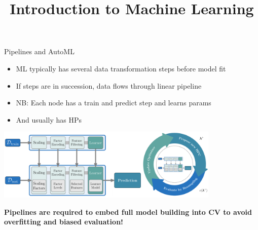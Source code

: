 
\newcommand{\titlefigure}{figure_man/linear_pipeline.png}
\newcommand{\learninggoals}{
\item Be able to explain a linear pipeline
\item Understand how HPO pipelines can be represented as DAGs
\item Know the difference between the HP space of a linear pipeline and a 
DAG}
\usepackage{../../style/lmu-lecture}




\title{Introduction to Machine Learning}
\date{}




\sloppy

\begin{vbframe}{Pipelines and AutoML}
\begin{itemize}
    \item ML typically has several data transformation steps before model fit
    \item If steps are in succession, data flows through linear pipeline
    \item NB: Each node has a train and predict step and learns params
    \item And usually has HPs
\end{itemize}


\vspace{0.5em}

\begin{center}
\includegraphics[width = 0.8\textwidth]{figure_man/linear_pipeline.png}
\end{center}

\vspace{0.5em}

\pause
\textbf{Pipelines are required to embed full model building into CV to avoid overfitting and biased evaluation!}
\end{vbframe}

